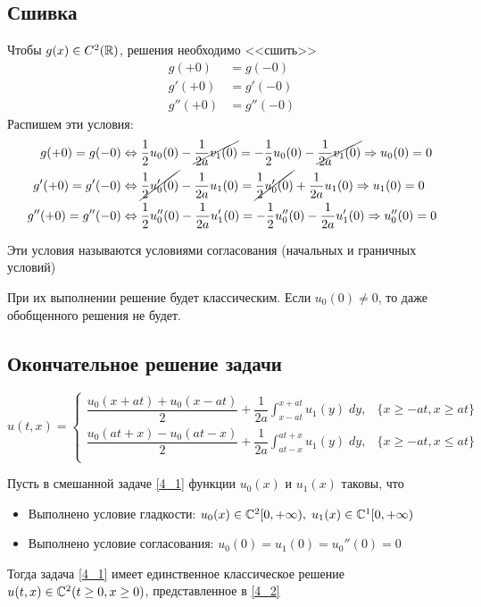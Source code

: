 \documentclass[../main.tex]{subfiles}
\begin{document}
\subsection{Сшивка}
Чтобы $g(x) \in C^2(\mathbb{R})$, решения необходимо <<сшить>>
\begin{align*}
    g(+0) &= g(-0) \\
    g'(+0) &= g'(-0) \\
    g''(+0) &= g''(-0)
\end{align*}
Распишем эти условия:
\begin{align*}
     g(+0) = g(-0) &\Leftrightarrow 
    \frac{1}{2}u_0(0) - \cancel{\frac{1}{2a}v_1(0)} = -\frac{1}{2}u_0(0) - \cancel{\frac{1}{2a}v_1(0)} \Rightarrow u_0(0) = 0 \\
     g'(+0) = g'(-0) &\Leftrightarrow \cancel{\frac{1}{2}u'_0(0)} - \frac{1}{2a}u_1(0) =
    \cancel{\frac{1}{2}u'_0(0)} + \frac{1}{2a}u_1(0) \Rightarrow u_1(0) = 0 \\
     g''(+0) = g''(-0) &\Leftrightarrow \frac{1}{2} u''_0(0) - \frac{1}{2a} u_1'(0) = -\frac{1}{2}u_0''(0) - \frac{1}{2a} u_1'(0) \Rightarrow u_0''(0) = 0
\end{align*}

\begin{definition}
    Эти условия называются условиями согласования (начальных и граничных условий)
\end{definition}

При их выполнении решение будет классическим. Если $u_0(0) \ne 0$, то даже обобщенного решения не будет.

\subsection{Окончательное решение задачи}

\begin{equation} \label{4_2}
        u(t, x) = \begin{cases}
            \dfrac{u_0(x+at) + u_0(x-at)}{2} + \dfrac{1}{2a}\displaystyle\int_{x-at}^{x+at}u_1(y)\;dy, & \{x\ge -at, x\ge at\} \\
            \dfrac{u_0(at+x) - u_0(at-x)}{2} + \dfrac{1}{2a}\displaystyle\int_{at-x}^{at+x}u_1(y)\;dy, & \{x\ge -at, x\le at\} \\
        \end{cases}
\end{equation}
\vspace{0pt}

\begin{theorem}
    Пусть в смешанной задаче \ref{4_1} функции $u_0(x)$ и $u_1(x)$ таковы, что 
    \begin{itemize}
        \item Выполнено условие гладкости: $u_0(x)\in \mathbb{C}^2[0, +\infty), \; u_1(x) \in \mathbb{C}^1[0, +\infty)$
        \item Выполнено условие согласования: $u_0(0) = u_1(0) = u_0''(0) = 0$
    \end{itemize}
    Тогда задача \ref{4_1} имеет единственное классическое решение $u(t,x) \in \mathbb{C}^2(t \ge 0, x\ge 0)$, представленное в \ref{4_2}
\end{theorem}
\end{document}
